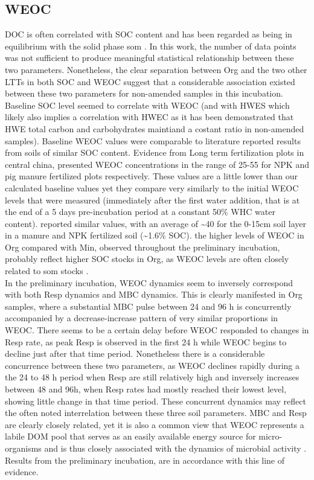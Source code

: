 	\subsection{WEOC}
	DOC is often correlated with SOC content and has been regarded as being in equilibrium with the solid phase \gls{som} \citep{malik2013}. In this work, the number of data points was not sufficient to produce meaningful statistical relationship between these two parameters. Nonetheless, the clear separation between Org and the two other LTTs in both SOC and WEOC suggest that a considerable association existed between these two parameters for non-amended samples in this incubation. Baseline SOC level seemed to correlate with WEOC (and with HWES which likely also implies a correlation with HWEC as it has been demonstrated that HWE total carbon and carbohydrates maintiand a costant ratio in non-amended samples).
	Baseline WEOC values were comparable to literature reported results from soils of similar SOC content. Evidence from Long term fertilization plots in central china, presented WEOC concentrations in the range of 25-55 \genericunit for NPK and pig manure fertilized plots respectively\citep{xu2018}. These values are a little lower than our calculated baseline values yet they compare very similarly to the initial WEOC levels that were measured (immediately after the first water addition, that is  at the end of a 5 days pre-incubation period at a constant 50\% WHC water content). \citet{hamkalo2014} reported similar values, with an average of \~{}40 \genericunit for the 0-15cm  soil layer in a manure and NPK fertilized soil (\~{}1.6\% SOC).
	the higher levels of WEOC in Org compared with Min, observed throughout the preliminary incubation, probably reflect higher SOC stocks in Org, as WEOC levels are often closely related to \gls{som} stocks\citep{malik2013} .\\
	In the preliminary incubation, WEOC dynamics seem to inversely correspond with both Resp dynamics and MBC dynamics. This is clearly manifested in Org samples, where a substantial MBC pulse between 24 and 96 h is concurrently accompanied by a decrease-increase pattern of very similar proportions in WEOC. There seems to be a certain delay before WEOC responded to changes in Resp rate, as peak Resp is observed in the first 24 h while WEOC begins to decline just after that time period. Nonetheless there is a considerable concurrence between these two parameters, as WEOC declines rapidly during a the 24 to 48 h period when Resp are still relatively high and inversely increases between 48 and 96h, when Resp rates had mostly reached their lowest level, showing little change in that time period. These concurrent dynamics may reflect the often noted interrelation between these three soil parameters. MBC and Resp are clearly closely related, yet it is also a common view that WEOC represents a labile DOM pool that serves as an easily available energy source for micro-organisms and is thus closely associated with the dynamics of microbial activity \citep{kemmitt2008, kaiser2012, guggenberger1998}. Results from the preliminary incubation, are in accordance with this line of evidence.\\


